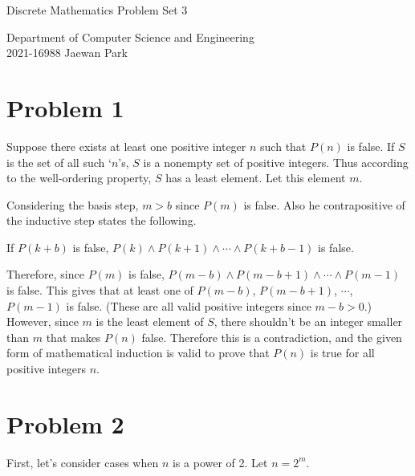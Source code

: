 \documentclass[10pt]{article}
\begin{document}
\vspace{4mm}
\begin{center}
    {\LARGE Discrete Mathematics Problem Set 3} \\
\end{center}
\begin{flushright}
    Department of Computer Science and Engineering \\
    2021-16988 Jaewan Park
\end{flushright}

\section*{Problem 1}

Suppose there exists at least one positive integer $n$ such that $P(n)$ is false. 
If $S$ is the set of all such `$n$'s, $S$ is a nonempty set of positive integers.
Thus according to the well-ordering property, $S$ has a least element.
Let this element $m$.

\vspace{3mm}
Considering the basis step, $m > b$ since $P(m)$ is false.
Also he contrapositive of the inductive step states the following.
\begin{center}
   If $P(k+b)$ is false, $P(k) \wedge P(k+1) \wedge \cdots \wedge P(k+b-1)$ is false.
\end{center}
Therefore, since $P(m)$ is false, $P(m-b) \wedge P(m-b+1) \wedge \cdots \wedge P(m-1)$ is false.
This gives that at least one of $P(m-b)$, $P(m-b+1)$, $\cdots$, $P(m-1)$ is false. (These are all valid positive integers since $m-b > 0$.)
However, since $m$ is the least element of $S$, there shouldn't be an integer smaller than $m$ that makes $P(n)$ false.
Therefore this is a contradiction, and the given form of mathematical induction is valid to prove that $P(n)$ is true for all positive integers $n$.

\section*{Problem 2}

First, let's consider cases when $n$ is a power of 2. Let $n = 2^m$.
\end{document}
